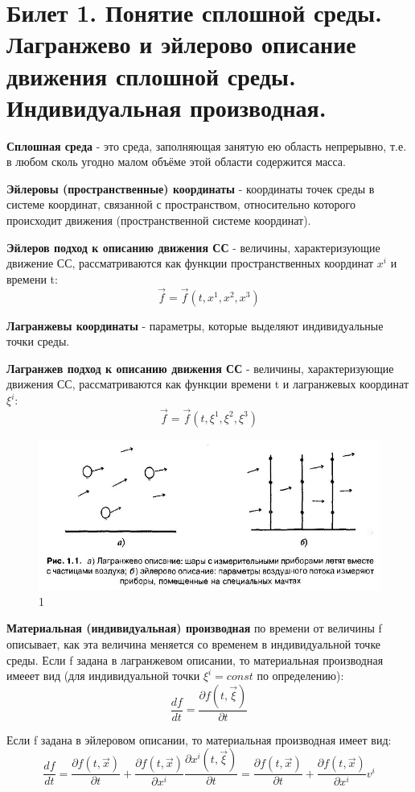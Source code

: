 \newpage
\section{Билет 1. Понятие сплошной среды. Лагранжево и эйлерово описание движения сплошной среды. Индивидуальная производная.}

\textbf{Сплошная среда} - это среда, заполняющая занятую ею область непрерывно, т.е. в любом сколь угодно малом объёме этой области содержится масса.

\textbf{Эйлеровы (пространственные) координаты} - координаты точек среды в системе координат, связанной с пространством, относительно которого происходит движения (пространственной системе координат).

\textbf{Эйлеров подход к описанию движения СС} - величины, характеризующие движение СС, рассматриваются как функции пространственных координат $x^i$ и времени t: $$\vec{f} = \vec{f}(t, x^1, x^2, x^3)$$

\textbf{Лагранжевы координаты} - параметры, которые выделяют индивидуальные точки среды.

\textbf{Лагранжев подход к описанию движения СС} - величины, характеризующие движения СС, рассматриваются как функции времени t и лагранжевых координат $\xi^i$: $$\vec{f} = \vec{f}(t, \xi^1, \xi^2, \xi^3)$$
\begin{figure}{}
\includegraphics[width=1\textwidth]{t1_pic1.JPG}
\caption{\label{ris:image2}1}
\end{figure}

\textbf{Материальная (индивидуальная) производная} по времени от величины f описывает, как эта величина меняется со временем в индивидуальной точке среды. Если f задана в лагранжевом описании, то материальная производная имееет вид (для индивидуальной точки $\xi^i = const $ по определению): $$\frac{df}{dt} = \frac{\partial f(t,\vec{\xi})}{\partial t}$$

Если f задана в эйлеровом описании, то материальная производная имеет вид: $$\frac{df}{dt} = \frac{\partial f(t,\vec{x})}{\partial t} + \frac{\partial f(t, \vec{x})}{\partial x^i}\frac{\partial x^i(t,\vec{\xi})}{\partial t} = \frac{\partial f(t,\vec{x})}{\partial t} + \frac{\partial f(t, \vec{x})}{\partial x^i}v^i$$
